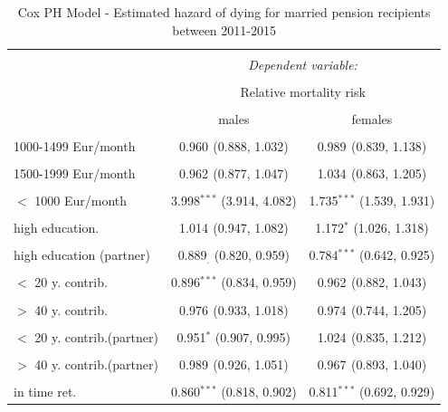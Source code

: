 \documentclass[a4paper,10pt,oneside,english]{article}
\begin{document}
%
\begin{table}[H] \centering 
	\caption{\textsf{Cox PH Model - Estimated hazard of dying for married pension recipients between 2011-2015}}
	\label{} 
	\begin{tabular}{@{\extracolsep{5pt}}lcc} 
		\\[-1.8ex]\hline 
		\hline \\[-1.8ex] 
		& \multicolumn{2}{c}{\textit{Dependent variable:}} \\ 
		\cline{2-3} 
		\\[-1.8ex] & \multicolumn{2}{c}{Relative mortality risk} \\ 
		\\[-1.8ex] & males & females \\ 
		\hline \\[-1.8ex] 
		1000-1499  Eur/month & 0.960$^{}$ (0.888, 1.032) & 0.989$^{}$ (0.839, 1.138) \\ 
		& & \\ 
		1500-1999  Eur/month & 0.962$^{}$ (0.877, 1.047) & 1.034$^{}$ (0.863, 1.205) \\ 
		& & \\ 
		$<$ 1000 Eur/month & 3.998$^{***}$ (3.914, 4.082) & 1.735$^{***}$ (1.539, 1.931) \\ 
		& & \\ 
		high education. & 1.014$^{}$ (0.947, 1.082) & 1.172$^{*}$ (1.026, 1.318) \\ 
		& & \\ 
		high education (partner) & 0.889$_{.}$ (0.820, 0.959) & 0.784$^{***}$ (0.642, 0.925) \\ 
		& & \\ 
		$<$ 20 y. contrib. & 0.896$^{***}$ (0.834, 0.959) & 0.962$^{}$ (0.882, 1.043) \\ 
		& & \\ 
		$>$ 40 y. contrib. & 0.976$^{}$ (0.933, 1.018) & 0.974$^{}$ (0.744, 1.205) \\ 
		& & \\ 
		$<$ 20 y. contrib.(partner) & 0.951$^{*}$ (0.907, 0.995) & 1.024$^{}$ (0.835, 1.212) \\ 
		& & \\ 
		$>$ 40 y. contrib.(partner) & 0.989$^{}$ (0.926, 1.051) & 0.967$^{}$ (0.893, 1.040) \\ 
		& & \\ 
		in time ret. & 0.860$^{***}$ (0.818, 0.902) & 0.811$^{***}$ (0.692, 0.929) \\ 

\end{tabular}
\end{table}
\end{document}
